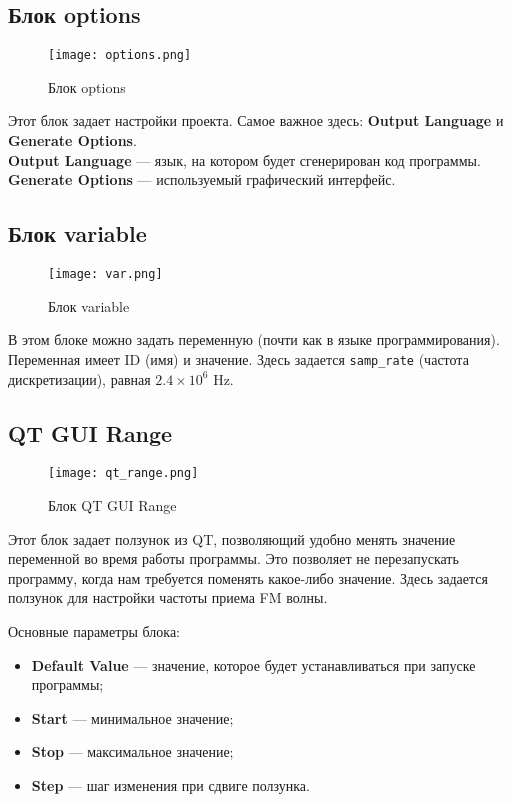 \subsection*{\textbf{Блок options}}

\begin{figure}[H]
    \centering
    \texttt{[image: options.png]}
    \caption{Блок options}
\end{figure}

Этот блок задает настройки проекта. Самое важное здесь: \textbf{Output Language} и \textbf{Generate Options}. \\
\textbf{Output Language} — язык, на котором будет сгенерирован код программы. \\
\textbf{Generate Options} — используемый графический интерфейс.

\subsection*{\textbf{Блок variable}}

\begin{figure}[H]
    \centering
    \texttt{[image: var.png]}
    \caption{Блок variable}
\end{figure}

В этом блоке можно задать переменную (почти как в языке программирования). Переменная имеет ID (имя) и значение.  
Здесь задается \texttt{samp\_rate} (частота дискретизации), равная $2.4 \times 10^6$ Hz.

\subsection*{\textbf{QT GUI Range}}

\begin{figure}[H]
    \centering
    \texttt{[image: qt\_range.png]}
    \caption{Блок QT GUI Range}
\end{figure}

Этот блок задает ползунок из QT, позволяющий удобно менять значение переменной во время работы программы.  
Это позволяет не перезапускать программу, когда нам требуется поменять какое-либо значение.  
Здесь задается ползунок для настройки частоты приема FM волны.

Основные параметры блока: 

\begin{itemize}
    \item \textbf{Default Value} — значение, которое будет устанавливаться при запуске программы;
    \item \textbf{Start} — минимальное значение;
    \item \textbf{Stop} — максимальное значение;
    \item \textbf{Step} — шаг изменения при сдвиге ползунка.
\end{itemize}

